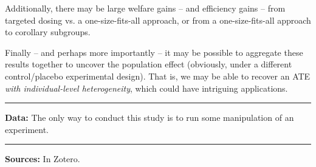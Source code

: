 \documentclass[12pt,letterpaper,doublespace, oneside]{article}
\begin{document}
Additionally, there may be large welfare gains -- and efficiency gains -- from targeted dosing vs. a one-size-fits-all approach, or from a one-size-fits-all approach to corollary subgroups. 

Finally -- and perhaps more importantly -- it may be possible to aggregate these results together to uncover the population effect (obviously, under a different control/placebo experimental design). That is, we may be able to recover an ATE \emph{with individual-level heterogeneity}, which could have intriguing applications. 

\noindent\rule{\linewidth}{0.4pt}

\noindent
\textbf{Data:} The only way to conduct this study is to run some manipulation of an experiment.

\noindent\rule{\linewidth}{0.4pt}

\noindent
\textbf{Sources:} In Zotero.













%
%
\end{document}
